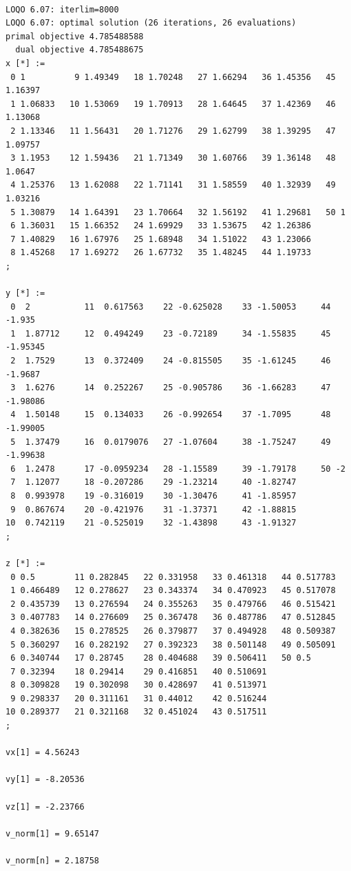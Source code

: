 \documentclass{article}
\begin{document}
\begin{verbatim}

LOQO 6.07: iterlim=8000
LOQO 6.07: optimal solution (26 iterations, 26 evaluations)
primal objective 4.785488588
  dual objective 4.785488675
x [*] :=
 0 1          9 1.49349   18 1.70248   27 1.66294   36 1.45356   45 1.16397
 1 1.06833   10 1.53069   19 1.70913   28 1.64645   37 1.42369   46 1.13068
 2 1.13346   11 1.56431   20 1.71276   29 1.62799   38 1.39295   47 1.09757
 3 1.1953    12 1.59436   21 1.71349   30 1.60766   39 1.36148   48 1.0647
 4 1.25376   13 1.62088   22 1.71141   31 1.58559   40 1.32939   49 1.03216
 5 1.30879   14 1.64391   23 1.70664   32 1.56192   41 1.29681   50 1
 6 1.36031   15 1.66352   24 1.69929   33 1.53675   42 1.26386
 7 1.40829   16 1.67976   25 1.68948   34 1.51022   43 1.23066
 8 1.45268   17 1.69272   26 1.67732   35 1.48245   44 1.19733
;

y [*] :=
 0  2           11  0.617563    22 -0.625028    33 -1.50053     44 -1.935
 1  1.87712     12  0.494249    23 -0.72189     34 -1.55835     45 -1.95345
 2  1.7529      13  0.372409    24 -0.815505    35 -1.61245     46 -1.9687
 3  1.6276      14  0.252267    25 -0.905786    36 -1.66283     47 -1.98086
 4  1.50148     15  0.134033    26 -0.992654    37 -1.7095      48 -1.99005
 5  1.37479     16  0.0179076   27 -1.07604     38 -1.75247     49 -1.99638
 6  1.2478      17 -0.0959234   28 -1.15589     39 -1.79178     50 -2
 7  1.12077     18 -0.207286    29 -1.23214     40 -1.82747
 8  0.993978    19 -0.316019    30 -1.30476     41 -1.85957
 9  0.867674    20 -0.421976    31 -1.37371     42 -1.88815
10  0.742119    21 -0.525019    32 -1.43898     43 -1.91327
;

z [*] :=
 0 0.5        11 0.282845   22 0.331958   33 0.461318   44 0.517783
 1 0.466489   12 0.278627   23 0.343374   34 0.470923   45 0.517078
 2 0.435739   13 0.276594   24 0.355263   35 0.479766   46 0.515421
 3 0.407783   14 0.276609   25 0.367478   36 0.487786   47 0.512845
 4 0.382636   15 0.278525   26 0.379877   37 0.494928   48 0.509387
 5 0.360297   16 0.282192   27 0.392323   38 0.501148   49 0.505091
 6 0.340744   17 0.28745    28 0.404688   39 0.506411   50 0.5
 7 0.32394    18 0.29414    29 0.416851   40 0.510691
 8 0.309828   19 0.302098   30 0.428697   41 0.513971
 9 0.298337   20 0.311161   31 0.44012    42 0.516244
10 0.289377   21 0.321168   32 0.451024   43 0.517511
;

vx[1] = 4.56243

vy[1] = -8.20536

vz[1] = -2.23766

v_norm[1] = 9.65147

v_norm[n] = 2.18758

\end{verbatim}
\end{document}
